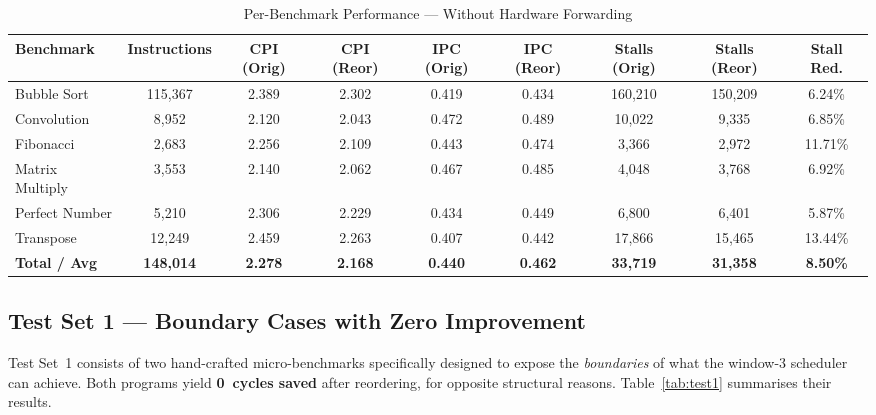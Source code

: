 \documentclass[11pt]{report}
\begin{document}
\begin{table}[H]
\centering
\caption{Per-Benchmark Performance --- Without Hardware Forwarding}
\label{tab:nfw_benchmark}
\renewcommand{\arraystretch}{1.3}
\begin{adjustbox}{max width=\linewidth, center}
\footnotesize
\begin{tabular}{@{}lcccccccc@{}}
\toprule
\textbf{Benchmark} & \textbf{Instructions} & \textbf{CPI (Orig)} & \textbf{CPI (Reor)} & \textbf{IPC (Orig)} & \textbf{IPC (Reor)} & \textbf{Stalls (Orig)} & \textbf{Stalls (Reor)} & \textbf{Stall Red.} \\
\midrule
Bubble Sort     & 115,367 & 2.389 & 2.302 & 0.419 & 0.434 & 160,210 & 150,209 & 6.24\% \\
Convolution     & 8,952   & 2.120 & 2.043 & 0.472 & 0.489 & 10,022  & 9,335   & 6.85\% \\
Fibonacci       & 2,683   & 2.256 & 2.109 & 0.443 & 0.474 & 3,366   & 2,972   & 11.71\% \\
Matrix Multiply & 3,553   & 2.140 & 2.062 & 0.467 & 0.485 & 4,048   & 3,768   & 6.92\% \\
Perfect Number  & 5,210   & 2.306 & 2.229 & 0.434 & 0.449 & 6,800   & 6,401   & 5.87\% \\
Transpose       & 12,249  & 2.459 & 2.263 & 0.407 & 0.442 & 17,866  & 15,465  & 13.44\% \\
\midrule
\textbf{Total / Avg} & \textbf{148,014} & \textbf{2.278} & \textbf{2.168} & \textbf{0.440} & \textbf{0.462} & \textbf{33,719} & \textbf{31,358} & \textbf{8.50\%} \\
\bottomrule
\end{tabular}
\end{adjustbox}
\end{table}

\subsection{Test Set 1 --- Boundary Cases with Zero Improvement}
\label{sec:test1}

Test Set~1 consists of two hand-crafted micro-benchmarks specifically designed to expose the \textit{boundaries} of what the window-3 scheduler can achieve. Both programs yield \textbf{0~cycles saved} after reordering, for opposite structural reasons. Table~\ref{tab:test1} summarises their results.
\end{document}
